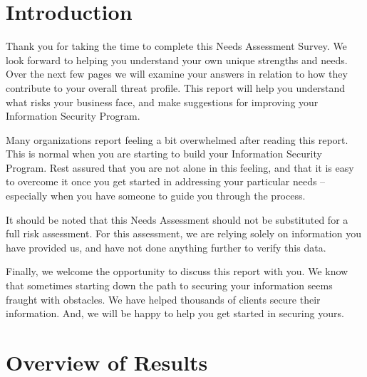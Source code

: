 \documentclass{needs}
\begin{document}
		\maketitle
		
		\tableofcontents

	
	
	\section{Introduction}
		Thank you for taking the time to complete this Needs Assessment Survey.  We look forward to helping you understand your own unique strengths and needs. Over the next few pages we will examine your answers in relation to how they contribute to your overall threat profile.  This report will help you understand what risks your business face, and make suggestions for improving your Information Security Program.
		
		Many organizations report feeling a bit overwhelmed after reading this report.  This is normal when you are starting to build your Information Security Program.  Rest assured that you are not alone in this feeling, and that it is easy to overcome it once you get started in addressing your particular needs – especially when you have someone to guide you through the process.
		
		It should be noted that this Needs Assessment should not be substituted for a full risk assessment.  For this assessment, we are relying solely on information you have provided us, and have not done anything further to verify this data.  
		
		Finally, we welcome the opportunity to discuss this report with you.  We know that sometimes starting down the path to securing your information seems fraught with obstacles.  We have helped thousands of clients secure their information.  And, we will be happy to help you get started in securing yours.
	
	\section{Overview of Results}
	
		\overallResults
		\vspace{20pt}
\end{document}
